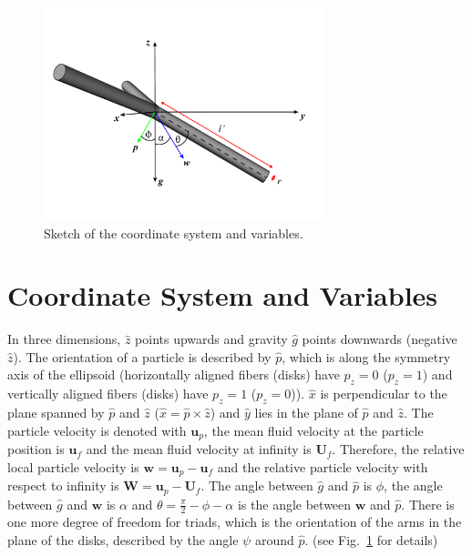 \documentclass[]{jfm}
\begin{document}
\clearpage

\appendix
\begin{figure}
\centering
  \includegraphics[width=3.2in]{figures/triad-perspective-coord.pdf}
  \caption{Sketch of the coordinate system and variables.}
\label{Fig:triad}
\end{figure}
\section{Coordinate System and Variables}
In three dimensions, $\hat{z}$ points upwards and gravity $\hat{g}$ points downwards (negative $\hat{z}$). The orientation of a particle is described by $\hat{p}$, which is along the symmetry axis of the ellipsoid (horizontally aligned fibers (disks) have $p_z {=} 0$ ($p_z {=} 1$) and vertically aligned fibers (disks) have $p_z {=} 1$ ($p_z {=} 0$)). $\hat{x}$ is perpendicular to the plane spanned by $\hat{p}$ and $\hat{z}$ ($\hat{x}=\hat{p}\times\hat{z}$) and $\hat{y}$ lies in the plane of $\hat{p}$ and $\hat{z}$. The particle velocity is denoted with $\mathbf{u}_p$, the mean fluid velocity at the particle position is $\mathbf{u}_f$ and the mean fluid velocity at infinity is $\mathbf{U}_f$. Therefore, the relative local particle velocity is $\mathbf{w}=\mathbf{u}_p-\mathbf{u}_f$ and the relative particle velocity with respect to infinity is $\mathbf{W}=\mathbf{u}_p-\mathbf{U}_f$. The angle between $\hat{g}$ and $\hat{p}$ is $\phi$, the angle between $\hat{g}$ and $\mathbf{w}$ is $\alpha$ and $\theta=\frac{\pi}{2}-\phi-\alpha$ is the angle between $\mathbf{w}$ and $\hat{p}$. There is one more degree of freedom for triads, which is the orientation of the arms in the plane of the disks, described by the angle $\psi$ around $\hat{p}$. (see Fig.~\ref{Fig:triad} for details)
\end{document}
